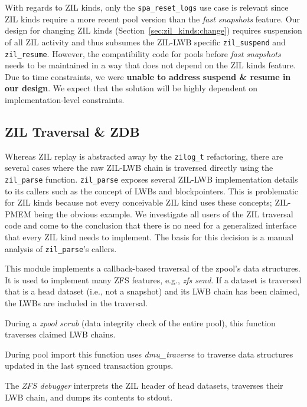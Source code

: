 \documentclass[12pt,a4paper,twoside]{book}
\begin{document}
With regards to ZIL kinds, only the \lstinline{spa_reset_logs} use case is relevant since ZIL kinds require a more recent pool version than the \textit{fast snapshots} feature.
Our design for changing ZIL kinds (Section~\ref{sec:zil_kinds:change}) requires suspension of all ZIL activity and thus subsumes the ZIL-LWB specific \lstinline{zil_suspend} and \lstinline{zil_resume}.
However, the compatibility code for pools before \textit{fast snapshots} needs to be maintained in a way that does not depend on the ZIL kinds feature.
Due to time constraints, we were \textbf{unable to address suspend \& resume in our design}.
We expect that the solution will be highly dependent on implementation-level constraints.

\subsection{ZIL Traversal \& ZDB}\label{sec:zil_kinds:traversal}
Whereas ZIL replay is abstracted away by the \lstinline{zilog_t} refactoring, there are several cases where the raw ZIL-LWB chain is traversed directly using the \lstinline{zil_parse} function.
\lstinline{zil_parse} exposes several ZIL-LWB implementation details to its callers such as the concept of LWBs and blockpointers.
This is problematic for ZIL kinds because not every conceivable ZIL kind uses these concepts; ZIL-PMEM being the obvious example.
We investigate all users of the ZIL traversal code and come to the conclusion that there is no need for a generalized interface that every ZIL kind needs to implement.
The basis for this decision is a manual analysis of \lstinline{zil_parse}'s callers.
\begin{description}[noitemsep]
    \item[dmu\_traverse] This module implements a callback-based traversal of the zpool's data structures.
    It is used to implement many ZFS features, e.g., \textit{zfs send}.
    If a dataset is traversed that is a head dataset (i.e., not a snapshot) and its LWB chain has been claimed, the LWBs are included in the traversal.
    \item[dsl\_scan\_zil] During a \textit{zpool scrub} (data integrity check of the entire pool), this function traverses claimed LWB chains.
    \item[spa\_load\_verify] During pool import this function uses \textit{dmu\_traverse} to traverse data structures updated in the last synced transaction groups.
    \item[zdb\_il.c] The \textit{ZFS debugger} interprets the ZIL header of head datasets, traverses their LWB chain, and dumps its contents to stdout.
\end{description}
\end{document}
